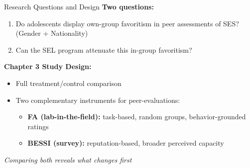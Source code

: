 \documentclass[xcolor=usenames,dvipsnames]{beamer}
\begin{document}
\addtocounter{framenumber}{-1}
%
\begin{frame}{Research Questions and Design}\label{slide:ch3design}
\small
\textbf{Two questions:}
\begin{enumerate}
    \item Do adolescents display own-group favoritism in peer assessments of SES? (Gender + Nationality)
    \item Can the SEL program attenuate this in-group favoritism?
\end{enumerate}
\vspace{0.3cm}
\textbf{Chapter 3 Study Design:}
\begin{itemize}
    \item Full treatment/control comparison
    \item Two complementary instruments for peer-evaluations:
    \begin{itemize}
        \item \textbf{FA (lab-in-the-field):} task-based, random groups, behavior-grounded ratings \hyperlink{slide:fa_sumstat}{}
        \item \textbf{BESSI (survey):} reputation-based, broader perceived capacity \hyperlink{slide:bessi_sumstat}{}
    \end{itemize}
\end{itemize}
\vspace{0.2cm}
\textit{Comparing both reveals what changes first}
\vspace{0.2cm}

\end{frame}
\end{document}
